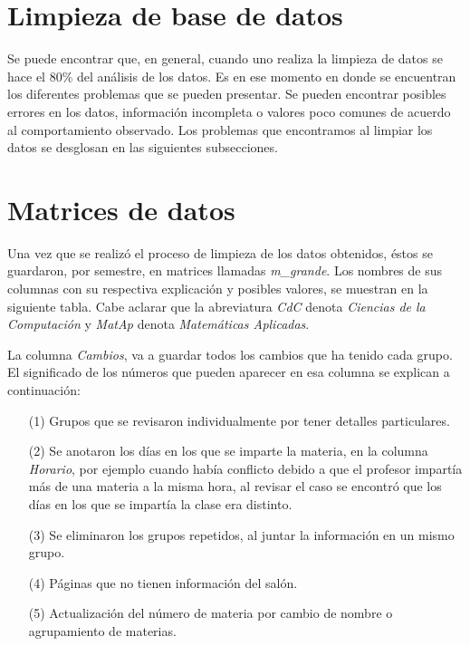 \section{Limpieza de base de datos} \label{sec_ED_LimpiezaDatos}

Se puede encontrar que, en general, cuando uno realiza la limpieza de datos se hace el 80\% del análisis de los datos. Es en ese momento en donde se encuentran los diferentes problemas que se pueden presentar. Se pueden encontrar posibles errores en los datos, información incompleta o valores poco comunes de acuerdo al comportamiento observado. Los problemas que encontramos al limpiar los datos se desglosan en las siguientes subsecciones.


\section{Matrices de datos}

Una vez que se realizó el proceso de limpieza de los datos obtenidos, éstos se guardaron, por semestre, en matrices llamadas \textit{m\_grande}. Los nombres de sus columnas con su respectiva explicación y posibles valores, se muestran en la siguiente tabla. Cabe aclarar que la abreviatura \textit{CdC} denota \textit{Ciencias de la Computación} y \textit{MatAp} denota \textit{Matemáticas Aplicadas}.

\dfNmatrizGrande %

La columna \textit{Cambios}, va a guardar todos los cambios que ha tenido cada grupo. El significado de los números que pueden aparecer en esa columna se explican a continuación:

\begin{enumerate}
\item[(1)] Grupos que se revisaron individualmente por tener detalles particulares.

\item[(2)] Se anotaron los días en los que se imparte la materia, en la columna \textit{Horario}, por ejemplo cuando había conflicto debido a que el profesor impartía más de una materia a la misma hora, al revisar el caso se encontró que los días en los que se impartía la clase era distinto.

\item[(3)] Se eliminaron los grupos repetidos, al juntar la información en un mismo grupo.

\item[(4)] Páginas que no tienen información del salón.

\item[(5)] Actualización del número de materia por cambio de nombre o agrupamiento de materias.
\end{enumerate}
